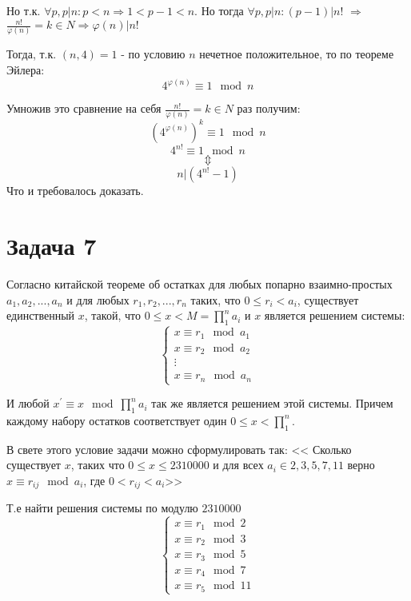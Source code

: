 \documentclass{article}
\begin{document}
		  Но т.к. $\forall p, p|n: p < n \Rightarrow 1 < p - 1 < n$. Но тогда $\forall p, p|n: (p - 1)|n! $ $\Rightarrow$ $\frac {n!}{\varphi(n)} = k \in N \Rightarrow \varphi(n) | n!$
		  
		  Тогда, т.к. $(n, 4) = 1$ - по условию $n$ нечетное положительное, то по теореме Эйлера:
		  $$ 4^{\varphi(n)} \equiv 1 \mod n $$
		  
		  Умножив это сравнение на себя $\frac {n!}{\varphi(n)} = k \in N$ раз получим:
		  $$ (4^{\varphi(n)})^{k} \equiv 1 \mod n $$
		  $$ 4^{n!} \equiv 1 \mod n $$
		  $$\Updownarrow$$
		  $$n | (4^{n!} - 1)$$		  
		  Что и требовалось доказать.
		  \section {Задача 7}
			   Согласно китайской теореме об остатках для любых попарно взаимно-простых $a_1, a_2, ..., a_n$ и для любых $r_1, r_2, ..., r_n$ таких, что $0 \leqslant r_i < a_i$, существует единственный $x$, такой, что $0 \leqslant x < M = \prod_{1}^{n} a_i$ и $x$ является решением системы: 
			\begin{equation*} 
				   \begin{cases}
				   x \equiv r_1 \mod a_1 \\
				   x \equiv r_2 \mod a_2 \\
				   \vdots
				   \\
				   x \equiv r_n \mod a_n
                   \end{cases}
			\end{equation*}
			
			И любой $x^\prime \equiv x \mod \prod_{1}^{n} a_i$ так же является решением этой системы. Причем каждому набору остатков соответствует один $0 \leqslant x < \prod_{1}^{n}$.
			
			В свете этого условие задачи можно сформулировать так: << Сколько существует $x$, таких что $0 \leqslant x \leqslant 2310000$  и для всех $a_i \in {2,3,5,7,11}$ верно $x \equiv r_{ij} \mod a_i$, где $0 < r_{ij} < a_i$>>
			
			Т.е найти решения системы по модулю $2310000$
			\begin{equation*} 
			\begin{cases}
			x \equiv r_1 \mod 2 \\
			x \equiv r_2 \mod 3 \\
			x \equiv r_3 \mod 5 \\
			x \equiv r_4 \mod 7 \\
			x \equiv r_5 \mod 11
			\end{cases}
			\end{equation*}
			
\end{document}
